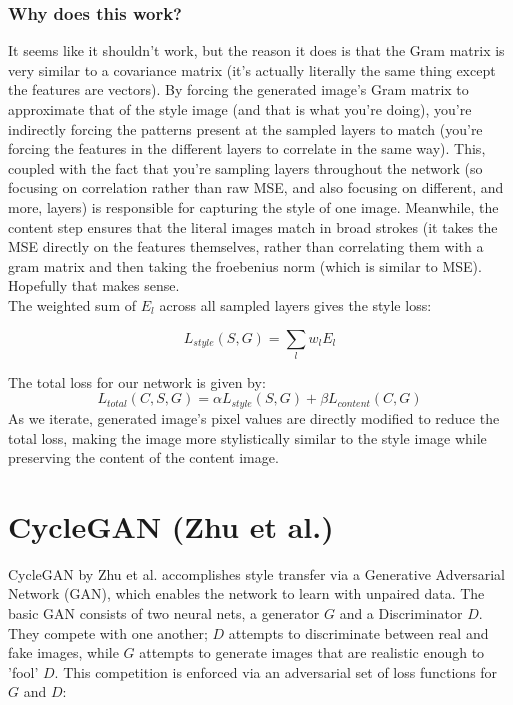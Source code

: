 \documentclass[12pt]{article}
\begin{document}
\subsubsection{Why does this work?}
It seems like it shouldn't work, but the reason it does is that the Gram matrix is very similar to a covariance matrix (it's actually literally the same thing except the features are vectors). By forcing the generated image's Gram matrix to approximate that of the style image (and that is what you're doing), you're indirectly forcing the patterns present at the sampled layers to match (you're forcing the features in the different layers to correlate in the same way). This, coupled with the fact that you're sampling layers throughout the network (so focusing on correlation rather than raw MSE, and also focusing on different, and more, layers) is responsible for capturing the style of one image.  Meanwhile, the content step ensures that the literal images match in broad strokes (it takes the MSE directly on the features themselves, rather than correlating them with a gram matrix and then taking the froebenius norm (which is similar to MSE). Hopefully that makes sense.\\

The weighted sum of \(E_l\) across all sampled layers gives the style loss:

\begin{equation}
    L_{style}(S, G) = \sum_{l} w_l E_l
\end{equation}

The total loss for our network is given by:
\begin{equation}
L_{total}(C,S,G) = \alpha L_{style}(S, G) + \beta L_{content}(C, G)
\end{equation}
As we iterate, generated image's pixel values are directly modified to reduce the total loss, making the image more stylistically similar to the style image while preserving the content of the content image. 

\section{CycleGAN (Zhu et al.)}

CycleGAN by Zhu et al. accomplishes style transfer via a Generative Adversarial Network (GAN), which enables the network to learn with unpaired data. The basic GAN consists of two neural nets, a generator \(G\) and a Discriminator \(D\). They compete with one another; \(D\) attempts to discriminate between real and fake images, while \(G\) attempts to generate images that are realistic enough to 'fool' \(D\). This competition is enforced via an adversarial set of loss functions for \(G\) and \(D\):
\end{document}
